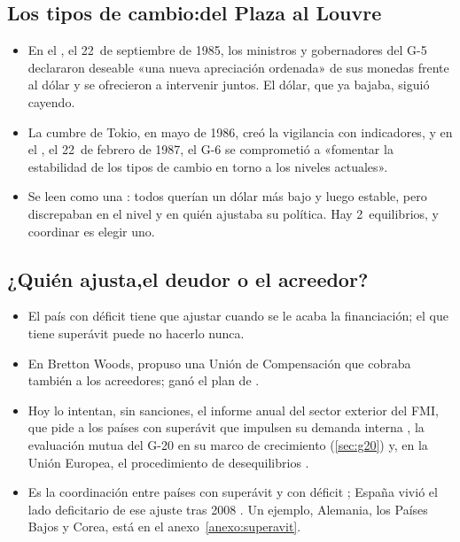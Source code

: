 \documentclass[11pt]{article}
\begin{document}
\subsection{Los tipos de cambio:\cortetitulo del Plaza al Louvre}\label{sec:hist-cambio}
\begin{itemize}
\item En el , el 22~de septiembre de 1985, los ministros y gobernadores del G-5 declararon deseable «una nueva apreciación ordenada» de sus monedas frente al dólar y se ofrecieron a intervenir juntos\nocite{G51985Plaza}. El dólar, que ya bajaba, siguió cayendo\nocite{Frankel2015Plaza}.
\item La cumbre de Tokio, en mayo de 1986, creó la vigilancia con indicadores, y en el , el 22~de febrero de 1987, el G-6 se comprometió a «fomentar la estabilidad de los tipos de cambio en torno a los niveles actuales»\nocite{G61987Louvre}.
\item Se leen como una  : todos querían un dólar más bajo y luego estable, pero discrepaban en el nivel y en quién ajustaba su política. Hay 2~equilibrios, y coordinar es elegir uno.
\end{itemize}

\subsection{¿Quién ajusta,\cortetitulo el deudor o el acreedor?}\label{sec:hist-ajuste}
\begin{itemize}
\item El país con déficit tiene que ajustar cuando se le acaba la financiación; el que tiene superávit puede no hacerlo nunca.
\item En Bretton Woods,  propuso una Unión de Compensación que cobraba también a los acreedores\nocite{Keynes1943Proposals}; ganó el plan de  .
\item Hoy lo intentan, sin sanciones, el informe anual del sector exterior del FMI, que pide a los países con superávit que impulsen su demanda interna\nocite{FMI2026ESR} , la evaluación mutua del G-20 en su marco de crecimiento (\ref{sec:g20}) y, en la Unión Europea, el procedimiento de desequilibrios .
\item Es la coordinación entre países con superávit y con déficit ; España vivió el lado deficitario de ese ajuste tras 2008 . Un ejemplo, Alemania, los Países Bajos y Corea, está en el anexo~\ref{anexo:superavit}.
\end{itemize}
\end{document}
